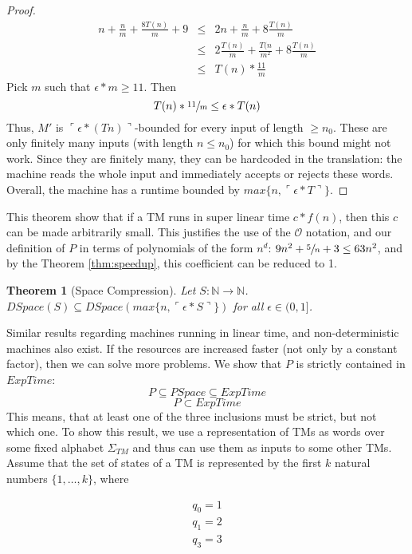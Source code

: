 \documentclass{report}
\newtheorem{theorem}[definition]{Theorem}
\begin{document}
\begin{proof}
\[
\begin{array}{rll}
n+\frac{n}{m}+\frac{8T(n)}{m}+9 &\leq &2n + \frac{n}{m} + 8 \frac{T(n)}{m}\\
&\leq &2 \frac{T(n)}{m} + \frac{T(n}{m^2}+8\frac{T(n)}{m}\\
&\leq &T(n) * \frac{11}{m}
\end{array}
\]
Pick $m$ such that $\epsilon*m\geq11$. Then 
\[ T(n) * \sfrac{11}{m} \leq \epsilon*T(n)\]
Thus, $M'$ is $\ulcorner\epsilon*(Tn)\urcorner$-bounded for every input of length $\geq n_0$. These are only finitely many inputs (with length $n\leq n_0$) for which this bound might not work. Since they are finitely many, they can be hardcoded in the translation: the machine reads the whole input and immediately accepts or rejects these words. Overall, the machine has a runtime bounded by  $max\{n, \ulcorner\epsilon*T\urcorner\}$.
\end{proof}

This theorem show that if a TM runs in super linear time $c*f(n)$, then this $c$ can be made arbitrarily small. This justifies the use of the $\mathcal{O}$ notation, and our definition of $P$ in terms of polynomials of the form $n^d$: $9n^2 + \sfrac{5}{n} + 3 \leq 63n^2$, and by the Theorem \ref{thm:speedup}, this coefficient can be reduced to 1.

\begin{theorem}[Space Compression]\label{thm:space-compression}
Let $S:\mathbb{N}\rightarrow \mathbb{N}$.\\$DSpace(S) \subseteq DSpace(max\{n,\ulcorner \epsilon*S \urcorner\})$ for all $\epsilon \in (0,1]$.
\end{theorem}
Similar results regarding machines running in linear time, and non-deterministic machines also exist. If the resources are increased faster (not only by a constant factor), then we can solve more problems. We show that $P$ is strictly contained in $ExpTime$:
\[P \subseteq PSpace \subseteq ExpTime \]\[
P \subset ExpTime \]
This means, that at least one of the three inclusions must be strict, but not which one. To show this result, we use a representation of TMs as words over some fixed alphabet $\Sigma_{TM}$ and thus can use them as inputs to some other TMs. Assume that the set of states of a TM is represented by the first $k$ natural numbers $\{1, \dots, k\}$, where

\[\begin{array}{c}
q_0 = 1\\
q_1 = 2\\
q_3 = 3
\end{array}\]
\end{document}
